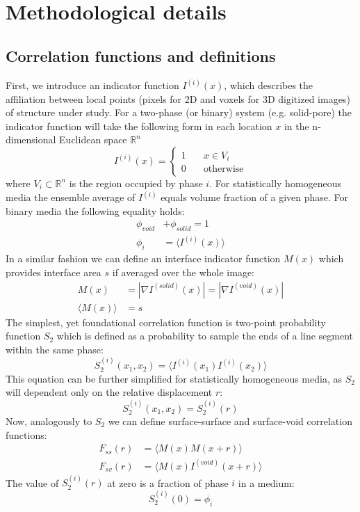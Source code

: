 \documentclass[reprint,amsmath,amssymb,aps,pre]{revtex4-1}
\begin{document}
\section{Methodological details}
\label{sec:details}
\subsection{Correlation functions and definitions}
First, we introduce an indicator function $I^{(i)}(x)$, which describes the
affiliation between local points (pixels for 2D and voxels for 3D digitized
images) of structure under study. For a two-phase (or binary) system
(e.g. solid-pore) the indicator function will take the following form in each
location $x$ in the n-dimensional Euclidean space $\mathbb{R}^n$
\begin{equation*}
  I^{(i)}(x) = \left\{
  \begin{array}{ll}
    1 & \quad x \in V_i \\
    0 & \quad \text{otherwise}
  \end{array}
  \right.
\end{equation*}
where $V_i \subset \mathbb{R}^n$ is the region occupied by phase $i$. For
statistically homogeneous media the ensemble average of $I^{(i)}$ equals volume
fraction of a given phase. For binary media the following equality holds:
\begin{align*}
  \phi_{void} &+ \phi_{solid} = 1 \\
  \phi_i &= \langle I^{(i)}(x) \rangle
\end{align*}
In a similar fashion we can define an interface indicator function $M(x)$ which
provides interface area $s$ if averaged over the whole image:
\begin{align}
  M(x) &= |\nabla I^{(solid)}(x)| =|\nabla I^{(void)}(x)| \label{eq:interface} \\
  \langle M(x) \rangle &= s
\end{align}
The simplest, yet foundational correlation function is two-point probability
function $S_2$ which is defined as a probability to sample the ends of a line
segment within the same phase:
\begin{equation}
  S_2^{(i)}(x_1, x_2) = \langle I^{(i)}(x_1) I^{(i)}(x_2) \rangle \label{eq:twopoint}
\end{equation}
This equation can be further simplified for statistically homogeneous media, as
$S_2$ will dependent only on the relative displacement $r$:
\begin{equation*}
  S_2^{(i)}(x_1, x_2) = S_2^{(i)}(r)
\end{equation*}
Now, analogously to $S_2$ we can define surface-surface and surface-void
correlation functions:
\begin{align}
  F_{ss}(r) &= \langle M(x)M(x+r) \rangle \label{eq:fss} \\
  F_{sv}(r) &= \langle M(x)I^{(void)}(x+r) \label{eq:fsv} \rangle
\end{align}
The value of $S^{(i)}_2(r)$ at zero is a fraction of phase $i$ in a medium:
\begin{equation}
  S_2^{(i)}(0) = \phi_i \label{eq:s2porosity}
\end{equation}
\end{document}
